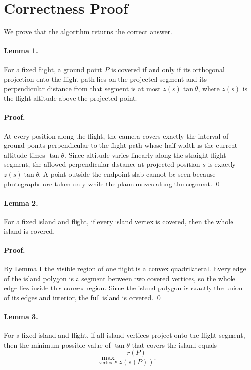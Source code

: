 \documentclass[11pt]{article}
\begin{document}
\section*{Correctness Proof}

We prove that the algorithm returns the correct answer.

\paragraph{Lemma 1.}
For a fixed flight, a ground point $P$ is covered if and only if its orthogonal projection onto the flight
path lies on the projected segment and its perpendicular distance from that segment is at most
$z(s)\tan\theta$, where $z(s)$ is the flight altitude above the projected point.

\paragraph{Proof.}
At every position along the flight, the camera covers exactly the interval of ground points perpendicular
to the flight path whose half-width is the current altitude times $\tan\theta$. Since altitude varies
linearly along the straight flight segment, the allowed perpendicular distance at projected position $s$ is
exactly $z(s)\tan\theta$. A point outside the endpoint slab cannot be seen because photographs are taken
only while the plane moves along the segment. \qed

\paragraph{Lemma 2.}
For a fixed island and flight, if every island vertex is covered, then the whole island is covered.

\paragraph{Proof.}
By Lemma 1 the visible region of one flight is a convex quadrilateral. Every edge of the island polygon is
a segment between two covered vertices, so the whole edge lies inside this convex region. Since the island
polygon is exactly the union of its edges and interior, the full island is covered. \qed

\paragraph{Lemma 3.}
For a fixed island and flight, if all island vertices project onto the flight segment, then the minimum
possible value of $\tan\theta$ that covers the island equals
\[
    \max_{\text{vertex }P}\frac{r(P)}{z(s(P))}.
\]
\end{document}
